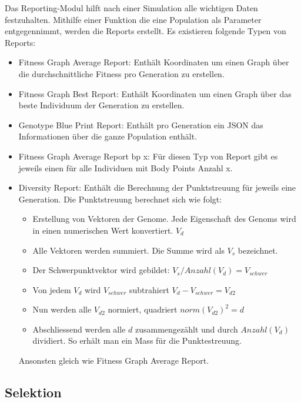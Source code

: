       Das Reporting-Modul hilft nach einer Simulation alle wichtigen Daten festzuhalten.
      Mithilfe einer Funktion die eine Population als Parameter entgegennimmt,
      werden die Reports erstellt. Es existieren folgende Typen von Reports:
      \begin{itemize}
        \item Fitness Graph Average Report: Enthält Koordinaten um einen Graph über die durchschnittliche Fitness pro Generation zu erstellen.
        \item Fitness Graph Best Report: Enthält Koordinaten um einen Graph über das beste Individuum der Generation zu erstellen.
        \item Genotype Blue Print Report: Enthält pro Generation ein JSON das Informationen über die ganze Population enthält.
        \item Fitness Graph Average Report bp x: Für diesen Typ von Report gibt es jeweils einen für alle Individuen mit Body Points Anzahl x.
        \item Diversity Report: Enthält die Berechnung der Punktstreuung für jeweils eine Generation. Die Punktstreuung berechnet sich wie folgt:
        \begin{itemize}
          \item Erstellung von Vektoren der Genome. Jede Eigenschaft des Genoms wird in einen numerischen Wert konvertiert. \( V_d \)
          \item Alle Vektoren werden summiert.  Die Summe wird als \(V_s\) bezeichnet.
          \item Der Schwerpunktvektor wird gebildet: \( V_s / Anzahl(V_d) = V_{schwer} \)
          \item Von jedem \(V_d\) wird \(V_{schwer}\) subtrahiert  \( V_d - V_{schwer}  = V_{d2} \)
          \item Nun werden alle \(V_{d2}\) normiert, quadriert \( norm{(V_{d2})}^2 = d \)
          \item Abschliessend werden alle \(d\) zusammengezählt und durch \(Anzahl(V_d)\) dividiert. So erhält man ein Mass für die Punktestreuung.
        \end{itemize}
        Ansonsten gleich wie Fitness Graph Average Report.
      \end{itemize}

    \subsection{Selektion\label{sec:Selektion}}

